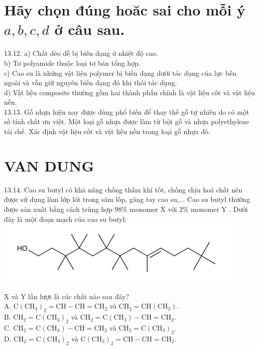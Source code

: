 \documentclass[10pt]{article}
\begin{document}
\section*{Hãy chọn đúng hoăc sai cho mỗi ý $a, b, c, d$ ở câu sau.}
13.12. a) Chất dẻo dễ bị biến dạng ở nhiệt độ cao.\\
b) Tơ polyamide thuộc loại tơ bán tổng hợp.\\
c) Cao su là những vật liệu polymer bị biến dạng dưới tác dụng của lực bên ngoài và vẫn giữ nguyên biến dạng đó khi thôi tác dụng.\\
d) Vật liệu composite thường gồm hai thành phần chính là vật liệu cốt và vật liệu nền.\\
13.13. Gỗ nhựa hiện nay được dùng phổ biến để thay thế gỗ tự nhiên do có một số tính chất ưu việt. Một loại gỗ nhựa được làm từ bột gỗ và nhựa polyethylene tái chế. Xác định vật liệu cốt và vật liệu nền trong loại gỗ nhựa đó.

\section*{VAN DUNG}
13.14. Cao su butyl có khả năng chống thấm khí tốt, chống chịu hoá chất nên được sử dụng làm lớp lót trong săm lốp, găng tay cao su,... Cao su butyl thường được sản xuất bằng cách trùng hợp $98 \%$ monomer X với $2 \%$ monomer Y . Dưới đây là một đoạn mạch của cao su butyl:\\
\includegraphics{smile-82c26c7cec4af5176c97cca85493f39f4cb3f80d}

X và Y lần lượt là các chất nào sau đây?\\
A. $\mathrm{C}\left(\mathrm{CH}_{3}\right)_{2}=\mathrm{CH}-\mathrm{CH}=\mathrm{CH}_{2}$ và $\mathrm{CH}_{2}=\mathrm{CH}\left(\mathrm{CH}_{3}\right)$.\\
B. $\mathrm{CH}_{2}=\mathrm{C}\left(\mathrm{CH}_{3}\right)_{2}$ và $\mathrm{CH}_{2}=\mathrm{C}\left(\mathrm{CH}_{3}\right)-\mathrm{CH}=\mathrm{CH}_{2}$.\\
C. $\mathrm{CH}_{2}=\mathrm{C}\left(\mathrm{CH}_{3}\right)-\mathrm{CH}=\mathrm{CH}_{2}$ và $\mathrm{CH}_{2}=\mathrm{C}\left(\mathrm{CH}_{3}\right)_{2}$.\\
D. $\mathrm{CH}_{2}=\mathrm{C}\left(\mathrm{CH}_{3}\right)_{2}$ và $\mathrm{C}\left(\mathrm{CH}_{3}\right)_{2}=\mathrm{CH}-\mathrm{CH}=\mathrm{CH}_{2}$.
\end{document}
